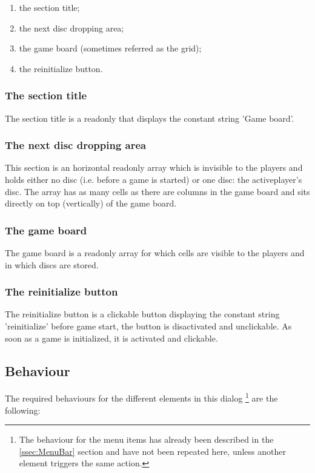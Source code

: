  \begin{enumerate}
    \item the section title;
    \item the next disc dropping area;
    \item the game board (sometimes referred as the grid);
    \item the reinitialize button.
  \end{enumerate}

    \subsubsection{The section title}
	The section title is a readonly  that displays the constant string
    'Game board'.

    \subsubsection{The next disc dropping area}
	This section is an horizontal readonly array which is invisible to the
    players and holds either no disc (i.e. before a game is started) or one
    disc: the activeplayer's disc. The array has as many cells as there are
	columns in the game board and sits directly on top (vertically) of the game
    board.

    \subsubsection{The game board}
	The game board is a readonly array for which cells are visible to the players
    and in which discs are stored.

    \subsubsection{The reinitialize button}
	The reinitialize button is a clickable button displaying the constant string
    'reinitialize' before game start, the button is disactivated and unclickable.
    As soon as a game is initialized, it is activated and clickable.

  \subsection{Behaviour} \label{ssec:GameBoardDlgBehaviour}
  The required behaviours for the different elements in this dialog \footnote{The
  behaviour for the menu items has already been described in the
  \cref{ssec:MenuBar} section and have not been repeated here, unless another
  element triggers the same action.} are the following:

